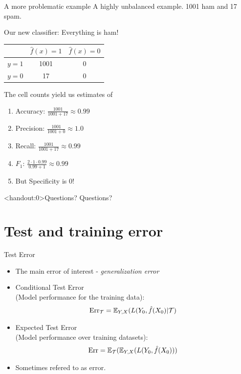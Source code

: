 \documentclass[10pt,handout]{beamer}
\begin{document}
\begin{frame}{A more problematic example}
A highly unbalanced example. 1001 ham and 17 spam.

Our new classifier: Everything is ham!\pause

\begin{center}
\begin{tabular}{ l | c | c }
  & $\hat{f}(x)=1$ & $\hat{f}(x)=0$\\
  \hline
  $y=1$ & 1001 & 0 \\
  $y=0$ & 17 & 0 \\
  \hline
\end{tabular}
\end{center}
\pause
The cell counts yield us estimates of
\begin{enumerate}
\item Accuracy: $\frac{1001}{1001+17}\approx 0.99$
\item Precision: $\frac{1001}{1001+0}\approx 1.0$
\item Recall: $\frac{1001}{1001+17}\approx 0.99$
\item $F_1$: $\frac{2 \cdot 1 \cdot 0.99}{0.99 + 1}\approx 0.99$
\item But Specificity is 0!
\end{enumerate}

\end{frame}




\begin{frame}<handout:0>{Questions?}
Questions?
\end{frame}



\section{Test and training error}
\frame{\sectionpage}

\begin{frame}{Test Error}

\begin{itemize}
\item The main error of interest - \emph{generalization error}
\item Conditional Test Error \\(Model performance for the  training data):
\[
\text{Err}_\mathcal{T} = \operatorname{\mathbb{E}}_{Y,X}(L(Y_0,\hat{f}(X_0) | \mathcal{T})
\]
\item Expected Test Error \\(Model performance over  training datasets):
\[
\text{Err} = \operatorname{\mathbb{E}}_\mathcal{T}(\operatorname{\mathbb{E}}_{Y,X}(L(Y_0,\hat{f}(X_0)))
\]
\item Sometimes refered to as  error.

\end{itemize}

\end{frame}
\end{document}
